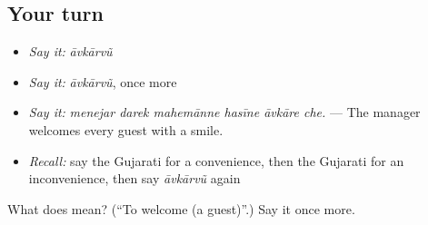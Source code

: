 \subsection*{Your turn}
\begin{itemize}
\raggedright
  \item \emph{Say it:} \emph{āvkārvũ}
  \item \emph{Say it:} \emph{āvkārvũ}, once more
  \item \emph{Say it:} \emph{menejar darek mahemānne hasīne āvkāre che.} — The manager welcomes every guest with a smile.
  \item \emph{Recall:} say the Gujarati for a convenience, then the Gujarati for an inconvenience, then say \emph{āvkārvũ} again
\end{itemize}

\begin{tcolorbox}[breakable,colback=teal!4,colframe=teal!35!black,title={Before you move on}]
What does  mean? (\textquotedblleft{}To welcome (a guest)\textquotedblright{}.) Say it once more.
\end{tcolorbox}
